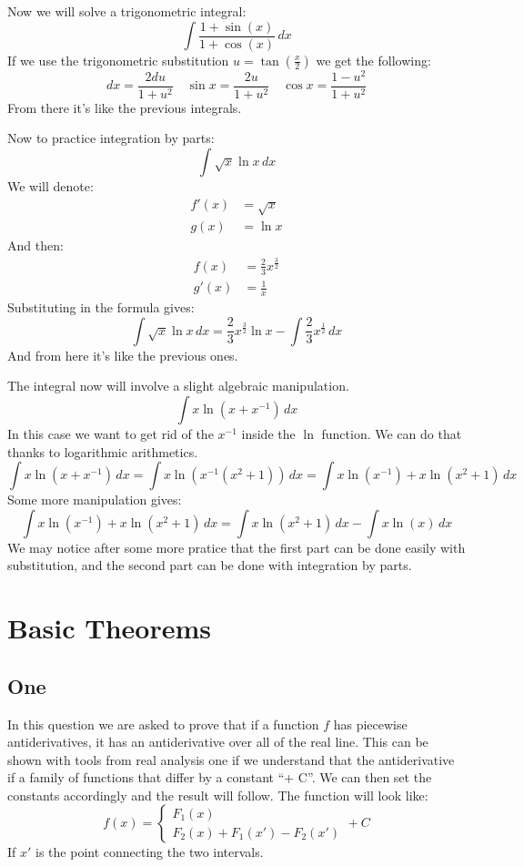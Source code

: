 \documentclass{article}
\theoremstyle{plain}
\begin{document}
	\newpage
	Now we will solve a trigonometric integral:
	\[
		\int{\frac{1+\sin(x)}{1+\cos(x)}\,dx}
	\]
	If we use the trigonometric substitution $u = \tan(\frac{x}{2})$ we get
	the following:
	\[
		dx = \frac{2du}{1+u^2} \quad 
		\sin x = \frac{2u}{1+u^2} \quad 
		\cos x = \frac{1-u^2}{1+u^2}
	\]
	From there it's like the previous integrals.
	
	\newpage
	
	Now to practice integration by parts:
	\[
		\int{\sqrt{x}\ln{x}\,dx}
	\]
	We will denote:
	\begin{align*}
		f'(x) &= \sqrt{x} \\
		g(x)  &= \ln x
	\end{align*}
	And then:
	\begin{align*}
		f(x) &= \frac{2}{3}x^{\frac{3}{2}} \\
		g'(x)  &= \frac{1}{x}
	\end{align*}
	Substituting in the formula gives:
	\[
		\int{\sqrt{x}\ln{x}\,dx} = 
		\frac{2}{3}x^{\frac{3}{2}}\ln x - 
		\int{\frac{2}{3}x^{\frac{1}{2}}\,dx}
	\]
	And from here it's like the previous ones.
	
	\newpage
	
	The integral now will involve a slight algebraic manipulation.
	\[
		\int{x\ln(x+x^{-1})\,dx}
	\]
	In this case we want to get rid of the $x^{-1}$ inside the $\ln$ function.
	We can do that thanks to logarithmic arithmetics.
	\[
		\int{x\ln(x+x^{-1})\,dx} = 
		\int{x\ln(x^{-1}(x^2+1))\,dx} =
		\int{x\ln(x^{-1}) + x\ln(x^2+1)\,dx}
	\]
	Some more manipulation gives:
	\[
		\int{x\ln(x^{-1}) + x\ln(x^2+1)\,dx} = 
		\int{x\ln(x^2+1)\,dx} - \int{x\ln(x)\,dx}
	\]
	We may notice after some more pratice that the first part can be done
	easily with substitution, and the second part can be done with integration
	by parts.
	
	\newpage
	
	\section{Basic Theorems}
	\subsection*{One}
	In this question we are asked to prove that if a function $f$ has 
	piecewise antiderivatives, it has an antiderivative over all of the real
	line. This can be shown with tools from real analysis one if we understand
	that the antiderivative if a family of functions that differ by a constant
	``+ C''. We can then set the constants accordingly and the result will
	follow. The function will look like:
	\[
		f(x) = \begin{cases}
			F_1(x) \\
			F_2(x) + F_1(x') - F_2(x')
		\end{cases} + C
	\]
	If $x'$ is the point connecting the two intervals.
	
\end{document}
